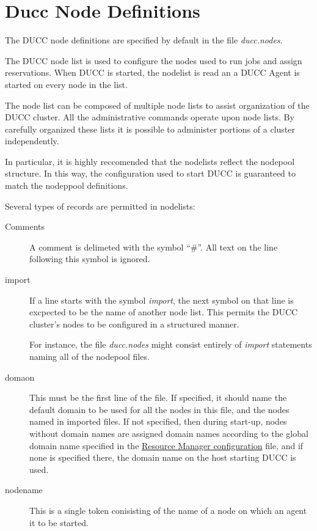 \section{Ducc Node Definitions}
\label{sec:admin-ducc.nodes}
    The DUCC node definitions are specified by default in the file {\em ducc.nodes}.

    The DUCC node list is used to configure the nodes used to run jobs and assign reservations. 
    When DUCC is started, the nodelist is read an a DUCC Agent is started on every node in the list.

    The node list can be composed of multiple node lists to assist organization of the DUCC cluster. 
    All the administrative commands operate upon node lists. By carefully organized these lists it is 
    possible to administer portions of a cluster independently. 

    In particular, it is highly reccomended that the nodelists reflect the nodepool structure.  In
    this way, the configuration used to start DUCC is guaranteed to match the nodeppool definitions.

    Several types of records are permitted in nodelists:
    \begin{description}

      \item[Comments] A comment is delimeted with the symbol ``$\#$''.  All text on the line
        following this symbol is ignored.

      \item[import] If a line starts with the symbol {\em import}, the next symbol on that line
        is excpected to be the name of another node list.  This permits the DUCC cluster's
        nodes to be configured in a structured manner.

        For instance, the file {\em ducc.nodes} might consist entirely of {\em import} statements
        naming all of the nodepool files.
      \item[domaon] This must be the first line of the file.  If specified, it should name
        the default domain to be used for all the nodes in this file, and the nodes named
        in imported files.  If not specified, then during start-up, nodes without domain names are assigned
        domain names according to the global domain name specified in the \hyperref[subsubsec:nodepool.configuration]{Resource Manager configuration}
        file, and if none is specified there, the domain name on the host starting DUCC is used.

      \item[nodename] This is a single token conisisting of the name of a node on which an
        agent it to be started.

    \end{description}

